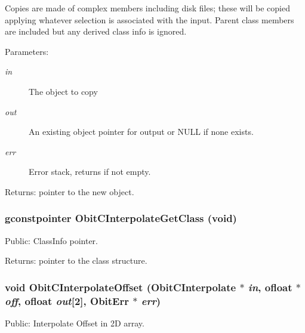Copies are made of complex members including disk files; these will be copied applying whatever selection is associated with the input. Parent class members are included but any derived class info is ignored. \begin{Desc}
\item[Parameters:]
\begin{description}
\item[{\em in}]The object to copy \item[{\em out}]An existing object pointer for output or NULL if none exists. \item[{\em err}]Error stack, returns if not empty. \end{description}
\end{Desc}
\begin{Desc}
\item[Returns:]pointer to the new object. \end{Desc}
\subsubsection{\setlength{\rightskip}{0pt plus 5cm}gconstpointer Obit\-CInterpolate\-Get\-Class (void)}\label{ObitCInterpolate_8h_a6}


Public: Class\-Info pointer. 

\begin{Desc}
\item[Returns:]pointer to the class structure. \end{Desc}
\subsubsection{\setlength{\rightskip}{0pt plus 5cm}void Obit\-CInterpolate\-Offset ({\bf Obit\-CInterpolate} $\ast$ {\em in}, {\bf ofloat} $\ast$ {\em off}, {\bf ofloat} {\em out}[2], {\bf Obit\-Err} $\ast$ {\em err})}\label{ObitCInterpolate_8h_a13}


Public: Interpolate Offset in 2D array. 

